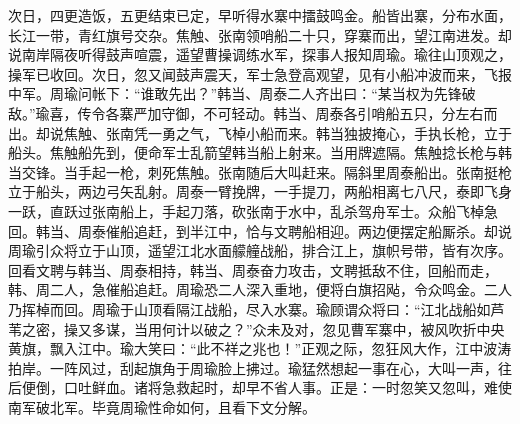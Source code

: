 次日，四更造饭，五更结束已定，早听得水寨中擂鼓鸣金。船皆出寨，分布水面，长江一带，青红旗号交杂。焦触、张南领哨船二十只，穿寨而出，望江南进发。却说南岸隔夜听得鼓声喧震，遥望曹操调练水军，探事人报知周瑜。瑜往山顶观之，操军已收回。次日，忽又闻鼓声震天，军士急登高观望，见有小船冲波而来，飞报中军。周瑜问帐下：“谁敢先出？”韩当、周泰二人齐出曰：“某当权为先锋破敌。”瑜喜，传令各寨严加守御，不可轻动。韩当、周泰各引哨船五只，分左右而出。却说焦触、张南凭一勇之气，飞棹小船而来。韩当独披掩心，手执长枪，立于船头。焦触船先到，便命军士乱箭望韩当船上射来。当用牌遮隔。焦触捻长枪与韩当交锋。当手起一枪，刺死焦触。张南随后大叫赶来。隔斜里周泰船出。张南挺枪立于船头，两边弓矢乱射。周泰一臂挽牌，一手提刀，两船相离七八尺，泰即飞身一跃，直跃过张南船上，手起刀落，砍张南于水中，乱杀驾舟军士。众船飞棹急回。韩当、周泰催船追赶，到半江中，恰与文聘船相迎。两边便摆定船厮杀。却说周瑜引众将立于山顶，遥望江北水面艨艟战船，排合江上，旗帜号带，皆有次序。回看文聘与韩当、周泰相持，韩当、周泰奋力攻击，文聘抵敌不住，回船而走，韩、周二人，急催船追赶。周瑜恐二人深入重地，便将白旗招飐，令众鸣金。二人乃挥棹而回。周瑜于山顶看隔江战船，尽入水寨。瑜顾谓众将曰：“江北战船如芦苇之密，操又多谋，当用何计以破之？”众未及对，忽见曹军寨中，被风吹折中央黄旗，飘入江中。瑜大笑曰：“此不祥之兆也！”正观之际，忽狂风大作，江中波涛拍岸。一阵风过，刮起旗角于周瑜脸上拂过。瑜猛然想起一事在心，大叫一声，往后便倒，口吐鲜血。诸将急救起时，却早不省人事。正是：一时忽笑又忽叫，难使南军破北军。毕竟周瑜性命如何，且看下文分解。